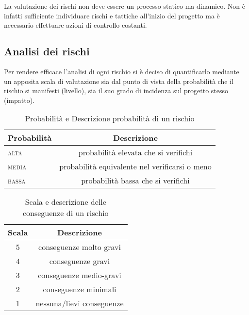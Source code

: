 La valutazione dei rischi non deve essere un processo statico ma dinamico. Non è infatti sufficiente individuare rischi e tattiche all'inizio del progetto ma è necessario effettuare azioni di controllo costanti. 

\subsection{Analisi dei rischi}

\newcommand{\hi}{\textsc{alta}}
\newcommand{\lo}{\textsc{bassa}}
\newcommand{\med}{\textsc{media}}
Per rendere efficace l'analisi di ogni rischio si è deciso di quantificarlo mediante un apposita scala di valutazione sia dal punto di vista della probabilità che il rischio si manifesti (livello), sia il suo grado di incidenza sul progetto stesso (impatto).

\begin{table}[h!]
\centering
\begin{tabular}{|l|c|}
\hline
Probabilità& Descrizione\\
\hline
\hi & probabilità elevata che si verifichi\\
\med & probabilità equivalente nel verificarsi o meno\\
\lo & probabilità bassa che si verifichi\\
\hline
\end{tabular}
\caption{Probabilità e Descrizione probabilità di un rischio}\label{tab:livellorischi}
\end{table}
\begin{table}[h!]
\centering
\begin{tabular}{|c|c|}
\hline
Scala& Descrizione  \\
\hline
5 & conseguenze molto gravi\\
4 & conseguenze gravi\\
3 & conseguenze medio-gravi\\
2 & conseguenze minimali\\
1 & nessuna/lievi conseguenze\\
\hline
\end{tabular}
\caption{Scala e descrizione delle conseguenze di un rischio}\label{tab:impattorischi}
\end{table}

